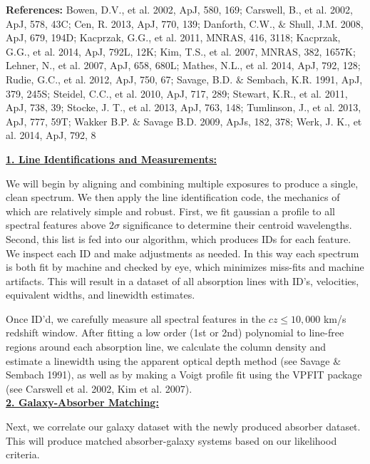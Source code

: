 \documentclass[12pt]{article}
\begin{document}
\noindent \textbf{References: } Bowen, D.V., et al. 2002, ApJ, 580, 169; Carswell, B., et al. 2002, ApJ, 578, 43C; Cen, R. 2013, ApJ, 770, 139; Danforth, C.W., $\&$ Shull, J.M. 2008, ApJ, 679, 194D; Kacprzak, G.G., et al. 2011, MNRAS, 416, 3118; Kacprzak, G.G., et al. 2014, ApJ, 792L, 12K; Kim, T.S., et al. 2007, MNRAS, 382, 1657K; Lehner, N., et al. 2007, ApJ, 658, 680L; Mathes, N.L., et al. 2014, ApJ, 792, 128; Rudie, G.C., et al. 2012, ApJ,  750, 67; Savage, B.D. $\&$ Sembach, K.R. 1991, ApJ, 379, 245S; Steidel, C.C., et al. 2010, ApJ, 717, 289; Stewart, K.R., et al. 2011, ApJ, 738, 39; Stocke, J. T., et al. 2013, ApJ, 763, 148; Tumlinson, J., et al. 2013, ApJ, 777, 59T; Wakker B.P. \& Savage B.D. 2009, ApJs, 182, 378; Werk, J. K., et al. 2014, ApJ, 792, 8

%
%
\describearchival       %

\noindent \textbf{\underline{1. Line Identifications and Measurements:}}

We will begin by aligning and combining multiple exposures to produce a single, clean spectrum. We then apply the line identification code, the mechanics of which are relatively simple and robust. First, we fit gaussian a profile to all spectral features above $2\sigma$ significance to determine their centroid wavelengths. Second, this list is fed into our algorithm, which produces IDs for each feature. We inspect each ID and make adjustments as needed. In this way each spectrum is both fit by machine and checked by eye, which minimizes miss-fits and machine artifacts. This will result in a dataset of all absorption lines with ID's, velocities, equivalent widths, and linewidth estimates.

Once ID'd, we carefully measure all spectral features in the $cz\le 10,000$ km/s redshift window. After fitting a low order (1st or 2nd) polynomial to line-free regions around each absorption line, we calculate the column density and estimate a linewidth using the apparent optical depth method (see Savage $\&$ Sembach 1991), as well as by making a Voigt profile fit using the VPFIT package (see Carswell et al. 2002, Kim et al. 2007).\\

\noindent \textbf{\underline{2. Galaxy-Absorber Matching:}}

Next, we correlate our galaxy dataset with the newly produced absorber dataset. This will produce matched absorber-galaxy systems based on our likelihood criteria. 
\end{document}
